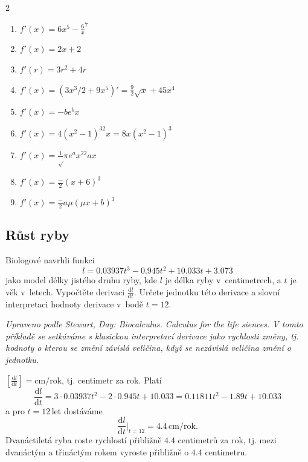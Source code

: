 \def\der#1.{$f'(x)=#1$}
\reseni
\begin{multicols}2
  \begin{enumerate}
  \item \der 6x^5-\frac{6}{x^7}.
  \item \der 2x+2.
  \item $f'(r)=3r^2+4r$
  \item \der (3x^{3/2}+9x^5)'=\frac 92\sqrt x+45x^4.
  \item \der -be^{bx}.
  \item \der 4(x^2-1)^32x=8x(x^2-1)^3.
  \item \der \frac 1{\sqrt \pi} e^{ax^2}2ax.
  \item \der \frac{-2}{(x+6)^3}.
  \item \der \frac{-2a\mu}{(\mu x+b)^3}.
  \end{enumerate}
\end{multicols}
\konec

\def\jednotka #1#2{\left[\frac{\mathrm{d}#1}{\mathrm{d}#2}\right]}
\def\derivace #1#2{\frac{\mathrm{d}#1}{\mathrm{d}#2}}


\stranka
{}
\subsection{Růst ryby}
Biologové navrhli funkci
  \begin{equation*}
    l=0.03937 t^3 - 0.945 t^2 + 10.033 t + 3.073
  \end{equation*}
  jako model délky jistého druhu ryby, kde $l$ je délka ryby v~centimetrech, a $t$ je věk v~letech.  Vypočtěte derivaci
  $\frac{\mathrm{d}l}{\mathrm {d}t}$. Určete jednotku této derivace a
  slovní interpretaci hodnoty derivace v~bodě $t=12$.

\textit{Upraveno podle Stewart, Day: Biocalculus. Calculus for the life siences. V tomto příkladě se setkáváme s klasickou interpretací derivace jako rychlosti změny, tj. hodnoty o kterou se změní závislá veličina, když se nezávislá veličina změní o jednotku.}

\reseni $\jednotka lt=\mathrm{cm}/\mathrm{rok}$, tj. centimetr za rok. Platí
  \begin{equation*}
    \derivace lt =3\cdot 0.03937 t^2 - 2\cdot 0.945 t + 10.033 =
    0.11811 t^2 -1.89 t + 10.033 
  \end{equation*}
  a pro $t=12\,\mathrm{let}$ dostáváme 
  \begin{equation*}
   \derivace lt\Bigr\vert_{t=12} =4.4\, \mathrm{cm}/\mathrm{rok}.
  \end{equation*}
  Dvanáctiletá ryba roste rychlostí přibližně $4.4$ centimetrů za rok,
tj. mezi dvanáctým a třináctým rokem vyroste přibližně o $4.4$
centimetru.

